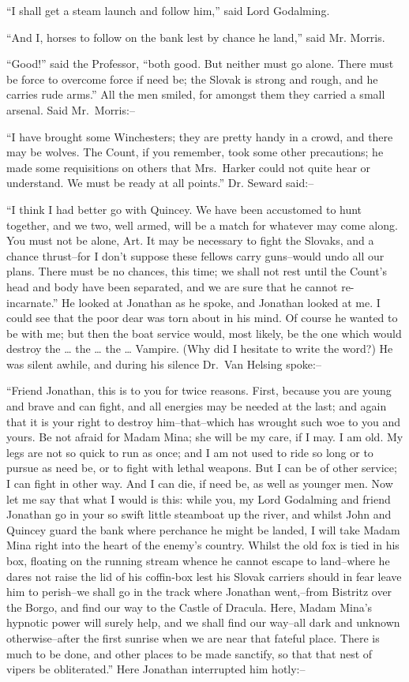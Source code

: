 \documentclass[12pt,openright]{book}
\begin{document}
“I shall get a steam launch and follow him,” said Lord Godalming.

“And I, horses to follow on the bank lest by chance he land,” said Mr. Morris.

“Good!” said the Professor, “both good. But neither must go alone. There must be force to overcome force if need be; the Slovak is strong and rough, and he carries rude arms.” All the men smiled, for amongst them they carried a small arsenal. Said Mr. Morris:–

“I have brought some Winchesters; they are pretty handy in a crowd, and there may be wolves. The Count, if you remember, took some other precautions; he made some requisitions on others that Mrs. Harker could not quite hear or understand. We must be ready at all points.” Dr. Seward said:–

“I think I had better go with Quincey. We have been accustomed to hunt together, and we two, well armed, will be a match for whatever may come along. You must not be alone, Art. It may be necessary to fight the Slovaks, and a chance thrust–for I don’t suppose these fellows carry guns–would undo all our plans. There must be no chances, this time; we shall not rest until the Count’s head and body have been separated, and we are sure that he cannot re-incarnate.” He looked at Jonathan as he spoke, and Jonathan looked at me. I could see that the poor dear was torn about in his mind. Of course he wanted to be with me; but then the boat service would, most likely, be the one which would destroy the … the … the … Vampire. (Why did I hesitate to write the word?) He was silent awhile, and during his silence Dr. Van Helsing spoke:–

“Friend Jonathan, this is to you for twice reasons. First, because you are young and brave and can fight, and all energies may be needed at the last; and again that it is your right to destroy him–that–which has wrought such woe to you and yours. Be not afraid for Madam Mina; she will be my care, if I may. I am old. My legs are not so quick to run as once; and I am not used to ride so long or to pursue as need be, or to fight with lethal weapons. But I can be of other service; I can fight in other way. And I can die, if need be, as well as younger men. Now let me say that what I would is this: while you, my Lord Godalming and friend Jonathan go in your so swift little steamboat up the river, and whilst John and Quincey guard the bank where perchance he might be landed, I will take Madam Mina right into the heart of the enemy’s country. Whilst the old fox is tied in his box, floating on the running stream whence he cannot escape to land–where he dares not raise the lid of his coffin-box lest his Slovak carriers should in fear leave him to perish–we shall go in the track where Jonathan went,–from Bistritz over the Borgo, and find our way to the Castle of Dracula. Here, Madam Mina’s hypnotic power will surely help, and we shall find our way–all dark and unknown otherwise–after the first sunrise when we are near that fateful place. There is much to be done, and other places to be made sanctify, so that that nest of vipers be obliterated.” Here Jonathan interrupted him hotly:–
\end{document}
